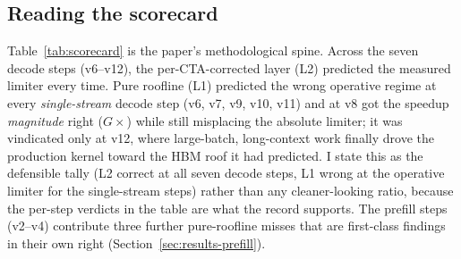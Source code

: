 \subsection{Reading the scorecard}
\label{sec:scorecard-read}
Table~\ref{tab:scorecard} is the paper's methodological spine. Across the seven
decode steps (v6--v12), the per-CTA-corrected layer (L2) predicted the measured
limiter every time. Pure roofline (L1) predicted the wrong operative regime at
every \emph{single-stream} decode step (v6, v7, v9, v10, v11) and at v8 got the
speedup \emph{magnitude} right ($G\times$) while still misplacing the absolute
limiter; it was vindicated only at v12, where large-batch, long-context work
finally drove the production kernel toward the HBM roof it had predicted. I state
this as the defensible tally (L2 correct at all seven decode steps, L1 wrong at
the operative limiter for the single-stream steps) rather than any cleaner-looking
ratio, because the per-step verdicts in the table are what the record supports.
The prefill steps (v2--v4) contribute three further pure-roofline misses that are
first-class findings in their own right (Section~\ref{sec:results-prefill}).
